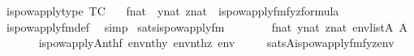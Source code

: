 \begin{isabellebody}
\isanewline
{}\isamarkupfalse%
\ is{\isacharunderscore}{\kern0pt}powapply{\isacharunderscore}{\kern0pt}type\ {\isacharbrackleft}{\kern0pt}TC{\isacharbrackright}{\kern0pt}\ {\isacharcolon}{\kern0pt}\isanewline
\ \ {\isachardoublequoteopen}{\isasymlbrakk}f{\isasymin}nat\ {\isacharsemicolon}{\kern0pt}\ y{\isasymin}nat{\isacharsemicolon}{\kern0pt}\ z{\isasymin}nat{\isasymrbrakk}\ {\isasymLongrightarrow}\ is{\isacharunderscore}{\kern0pt}powapply{\isacharunderscore}{\kern0pt}fm{\isacharparenleft}{\kern0pt}f{\isacharcomma}{\kern0pt}y{\isacharcomma}{\kern0pt}z{\isacharparenright}{\kern0pt}{\isasymin}formula{\isachardoublequoteclose}\isanewline
%
\isadelimproof
\ \ %
\endisadelimproof
%
\isatagproof
{}\isamarkupfalse%
\ is{\isacharunderscore}{\kern0pt}powapply{\isacharunderscore}{\kern0pt}fm{\isacharunderscore}{\kern0pt}def\ \isamarkupfalse%
\ simp%
\endisatagproof
{\isafoldproof}%
%
\isadelimproof
\isanewline
%
\endisadelimproof
\isanewline
{}\isamarkupfalse%
\ sats{\isacharunderscore}{\kern0pt}is{\isacharunderscore}{\kern0pt}powapply{\isacharunderscore}{\kern0pt}fm\ {\isacharcolon}{\kern0pt}\isanewline
\ \ \isanewline
\ \ \ \ {\isachardoublequoteopen}f{\isasymin}nat{\isachardoublequoteclose}\ {\isachardoublequoteopen}y{\isasymin}nat{\isachardoublequoteclose}\ {\isachardoublequoteopen}z{\isasymin}nat{\isachardoublequoteclose}\ {\isachardoublequoteopen}env{\isasymin}list{\isacharparenleft}{\kern0pt}A{\isacharparenright}{\kern0pt}{\isachardoublequoteclose}\ {\isachardoublequoteopen}{}{\isasymin}A{\isachardoublequoteclose}\isanewline
\ \ \isanewline
\ \ \ \ {\isachardoublequoteopen}is{\isacharunderscore}{\kern0pt}powapply{\isacharparenleft}{\kern0pt}{\isacharhash}{\kern0pt}{\isacharhash}{\kern0pt}A{\isacharcomma}{\kern0pt}nth{\isacharparenleft}{\kern0pt}f{\isacharcomma}{\kern0pt}\ env{\isacharparenright}{\kern0pt}{\isacharcomma}{\kern0pt}nth{\isacharparenleft}{\kern0pt}y{\isacharcomma}{\kern0pt}\ env{\isacharparenright}{\kern0pt}{\isacharcomma}{\kern0pt}nth{\isacharparenleft}{\kern0pt}z{\isacharcomma}{\kern0pt}\ env{\isacharparenright}{\kern0pt}{\isacharparenright}{\kern0pt}\isanewline
\ \ \ \ {\isasymlongleftrightarrow}\ sats{\isacharparenleft}{\kern0pt}A{\isacharcomma}{\kern0pt}is{\isacharunderscore}{\kern0pt}powapply{\isacharunderscore}{\kern0pt}fm{\isacharparenleft}{\kern0pt}f{\isacharcomma}{\kern0pt}y{\isacharcomma}{\kern0pt}z{\isacharparenright}{\kern0pt}{\isacharcomma}{\kern0pt}env{\isacharparenright}{\kern0pt}{\isachardoublequoteclose}\isanewline

\end{isabellebody}
